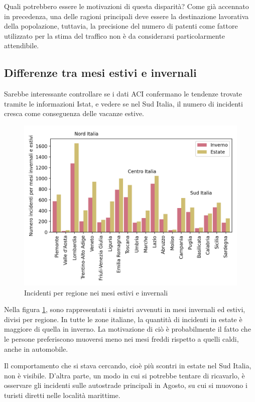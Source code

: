 \documentclass[a4paper,12pt]{report}
\begin{document}
Quali potrebbero essere le motivazioni di questa disparità?
Come già accennato in precedenza, una delle ragioni principali 
deve essere la destinazione lavorativa della popolazione, tuttavia, 
la precisione del numero di patenti come fattore utilizzato per la stima 
del traffico non è da considerarsi particolarmente attendibile. 

\subsection{Differenze tra mesi estivi e invernali}

Sarebbe interessante controllare se i dati ACI confermano le tendenze trovate tramite 
le informazioni Istat, e vedere se nel Sud Italia, il numero di incidenti cresca 
come conseguenza delle vacanze estive. 

\begin{figure}
    \includegraphics[width=\linewidth]{../src/incidenti/incidenti_aci/mappe_regioni/estate_inverno.png}
    \caption{Incidenti per regione nei mesi estivi e invernali}
    \label{fig:estate-inverno}
\end{figure}

Nella figura \ref{fig:estate-inverno}, sono rappresentati i sinistri avvenuti 
in mesi invernali ed estivi, divisi per regione. 
In tutte le zone italiane, la quantità di incidenti in estate è maggiore di quella 
in inverno. 
La motivazione di ciò è probabilmente il fatto che 
le persone preferiscono muoversi meno nei mesi freddi rispetto a quelli caldi, 
anche in automobile. 

Il comportamento che si stava cercando, cioè più scontri in estate nel 
Sud Italia, non è visibile. 
D'altra parte, un modo in cui si potrebbe tentare di ricavarlo, è osservare gli 
incidenti sulle autostrade principali in Agosto, su cui si muovono i turisti diretti 
nelle località marittime. 
\end{document}
